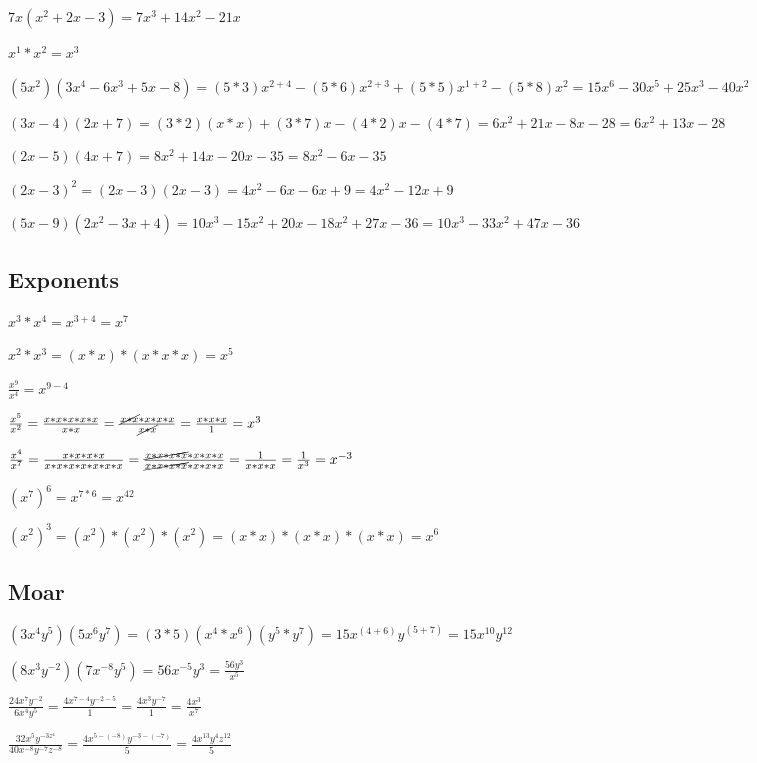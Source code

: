 \documentclass[11pt,a4paper,leqno]{article}
\begin{document}
$7x(x^2 + 2x -3) = 7x^3 + 14x^2 -21x$

$x^1 * x^2 = x^3$

$(5x^2)(3x^4 - 6x^3 + 5x - 8) = (5 * 3)x^{2 + 4} - (5 * 6)x^{2 + 3} + (5 * 5)x^{1 + 2} - (5 * 8)x^2 = 15x^6 - 30x^5 + 25x^3 - 40x^2$

$(3x - 4)(2x + 7) = (3  * 2)(x * x) + (3 * 7)x -(4 * 2)x - (4 * 7) = 6x^2 + 21x - 8x - 28 = 6x^2 + 13x - 28$

$(2x - 5)(4x + 7) = 8x^2 + 14x - 20x - 35 = 8x^2 - 6x - 35$

$(2x - 3)^2 = (2x-3)(2x-3) = 4x^2 - 6x - 6x + 9 = 4x^2 - 12x + 9$

$(5x - 9)(2x^2 - 3x + 4) = 10x^3 -15x^2 + 20x -18x^2 +27x -36 = 10x^3 -33x^2 + 47x -36$

\subsection{Exponents}

$x^3 * x^4 = x^{3 + 4} = x^7$

$x^2 * x^3 = (x * x) * (x * x * x) = x^5$

$\frac{x^9}{x^4} = x^{9 - 4}$

$\frac{x^5}{x^2} = \frac{x * x * x * x * x}{x * x} = \frac{\cancel{x * x} * x * x * x}{\cancel{x * x}} = \frac{x * x * x}{1} = x^3$

$\frac{x^4}{x^7} = \frac{x * x * x * x}{x * x * x * x * x * x * x} = \frac{\cancel{x * x * x * x} * x * x * x}{\cancel{x * x * x * x} * x * x * x} = \frac{1}{x * x * x} = \frac{1}{x^3} = x^{-3}$

$(x^7)^6 = x^{7 * 6} = x^{42}$

$(x^2)^3 = (x^2) * (x^2) * (x^2) = (x * x) * (x * x) * (x * x) = x^6$

\subsection{Moar}

$(3x^4y^5)(5x^6y^7) = (3 * 5)(x^4 * x^6)(y^5 * y^7) = 15x^{(4 + 6)}y^{(5 + 7)} = 15x^{10}y^{12}$

$(8x^3y^{-2})(7x^{-8}y^5) = 56x^{-5}y^3 = \frac{56y^3}{x^5}$

$\frac{24x^7y^{-2}}{6x^4y^5} = \frac{4x^{7 - 4}y^{-2 - 5}}{1} = \frac{4x^{3}y^{-7}}{1} = \frac{4x^{3}}{x^7}$

$\frac{32x^5y^{-3z^4}}{40x^{-8}y^{-7}z^{-8}} = \frac{4x^{5 - (-8)}y^{-3 - (-7)}}{5} = \frac{4x^{13}y^4z^{12}}{5}$
\end{document}

